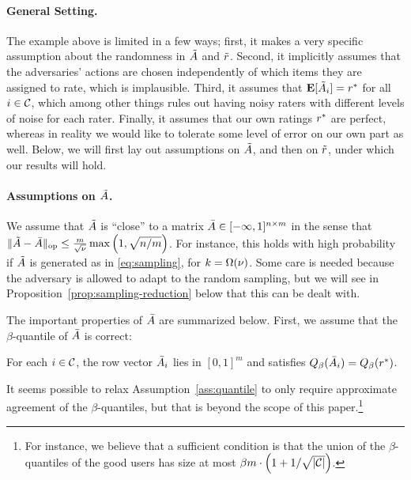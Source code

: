 \paragraph{General Setting.}
The example above is limited in a few ways; first, it makes a very specific 
assumption about the randomness in $\tilde{A}$ and $\tilde{r}$. Second, it implicitly 
assumes that the adversaries' actions are chosen independently of which items 
they are assigned to rate, which is implausible. Third, it assumes that 
$\mathbf{E}[\tilde{A}_i] = r^*$ for all $i \in \mathcal{C}$, which among other things rules out 
having noisy raters with different levels of noise for each rater.
Finally, it assumes that our own ratings $r^*$ are perfect, whereas in reality 
we would like to tolerate some level of error on our own part as well.
Below, we will first lay out assumptions on $\tilde{A}$, and then on $\tilde{r}$, 
under which our results will hold.

\paragraph{Assumptions on $\tilde{A}$.}
We assume that $\tilde{A}$ is ``close'' to a matrix 
$\bar{A} \in [-\infty,1]^{n \times m}$ in the sense that 
$\|\tilde{A} - \bar{A}\|_{\mathrm{op}} \leq \frac{m}{\sqrt{\nu}}\max\left( 1, \sqrt{n/m} \right)$. 
For instance, this holds with high probability if $\tilde{A}$ is generated as in 
\eqref{eq:sampling}, for $k = \Omega(\nu)$. Some care is needed because the 
adversary is allowed to adapt to the random sampling, but we will see in 
Proposition~\ref{prop:sampling-reduction} below that this can be dealt with.

The important properties of $\bar{A}$ are summarized below.
First, we assume that the $\beta$-quantile of $\bar{A}$ is correct:
\begin{assumption}
\label{ass:quantile}
For each $i \in \mathcal{C}$, the row vector $\bar{A}_i$ lies in $[0,1]^m$ and satisfies 
$Q_{\beta}(\bar{A}_i) = Q_{\beta}(r^*)$.
\end{assumption}
It seems possible to relax Assumption~\ref{ass:quantile} to only 
require approximate agreement of the $\beta$-quantiles, but that is beyond the 
scope of this paper.\footnote{For instance, we believe that 
a sufficient condition is that the union of the $\beta$-quantiles of the good 
users has size at most $\beta m \cdot \left( 1 + 1/\sqrt{|\mathcal{C}|} \right)$.}

